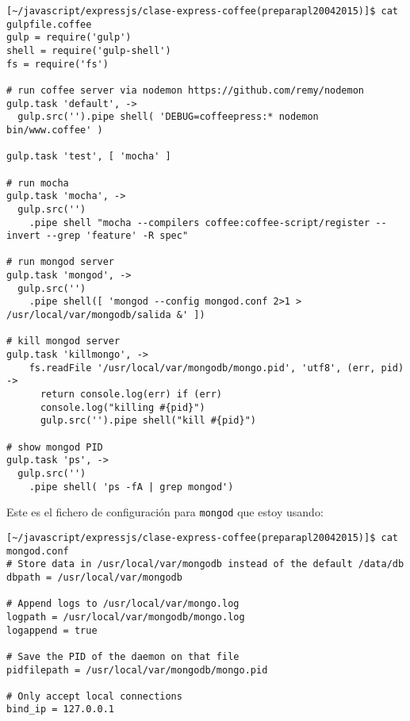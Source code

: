 \begin{verbatim}
[~/javascript/expressjs/clase-express-coffee(preparapl20042015)]$ cat gulpfile.coffee 
gulp = require('gulp')
shell = require('gulp-shell')
fs = require('fs')

# run coffee server via nodemon https://github.com/remy/nodemon
gulp.task 'default', ->
  gulp.src('').pipe shell( 'DEBUG=coffeepress:* nodemon bin/www.coffee' )

gulp.task 'test', [ 'mocha' ]

# run mocha
gulp.task 'mocha', ->
  gulp.src('')
    .pipe shell "mocha --compilers coffee:coffee-script/register --invert --grep 'feature' -R spec"

# run mongod server
gulp.task 'mongod', ->
  gulp.src('')
    .pipe shell([ 'mongod --config mongod.conf 2>1 > /usr/local/var/mongodb/salida &' ])

# kill mongod server
gulp.task 'killmongo', ->
    fs.readFile '/usr/local/var/mongodb/mongo.pid', 'utf8', (err, pid) ->
      return console.log(err) if (err)
      console.log("killing #{pid}")
      gulp.src('').pipe shell("kill #{pid}")

# show mongod PID
gulp.task 'ps', ->
  gulp.src('')
    .pipe shell( 'ps -fA | grep mongod')
\end{verbatim}
Este es el fichero de configuración para \verb|mongod| que estoy usando:
\begin{verbatim}
[~/javascript/expressjs/clase-express-coffee(preparapl20042015)]$ cat mongod.conf 
# Store data in /usr/local/var/mongodb instead of the default /data/db
dbpath = /usr/local/var/mongodb

# Append logs to /usr/local/var/mongo.log
logpath = /usr/local/var/mongodb/mongo.log
logappend = true

# Save the PID of the daemon on that file
pidfilepath = /usr/local/var/mongodb/mongo.pid

# Only accept local connections
bind_ip = 127.0.0.1
\end{verbatim}

